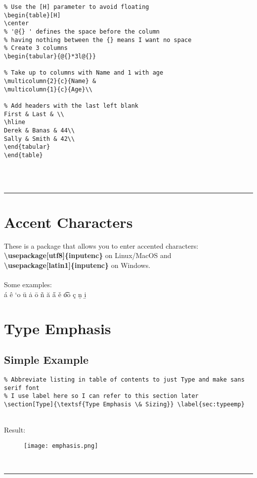 \documentclass[a4paper,12pt,titlepage]{article}
\begin{document}
\begin{minipage}{\linewidth}
\begin{lstlisting}  
% Use the [H] parameter to avoid floating
\begin{table}[H]
\center
% '@{} ' defines the space before the column
% having nothing between the {} means I want no space
% Create 3 columns
\begin{tabular}{@{}*3l@{}}

% Take up to columns with Name and 1 with age
\multicolumn{2}{c}{Name} &
\multicolumn{1}{c}{Age}\\

% Add headers with the last left blank
First & Last & \\
\hline
Derek & Banas & 44\\
Sally & Smith & 42\\
\end{tabular}
\end{table}

\end{lstlisting}
\end{minipage}
~\\
\\
\rule{\linewidth}{0.1mm}




\section{Accent Characters}
These is a package that allows you to enter accented characters:
\\
\textbf{\textbackslash usepackage[utf8]\{inputenc\}} on Linux/MacOS and
\\
\textbf{\textbackslash usepackage[latin1]\{inputenc\}} on Windows.
\\
\\
Some examples:
\\
\'{a} \^{e} `{o} \"{u} \.{a} \={o} \~{n} \u{a} \H{a} \v{e} \t{oo} \c{c} \d{n} \b{i}




\section{Type Emphasis}
\subsection{Simple Example}
\begin{lstlisting} 
% Abbreviate listing in table of contents to just Type and make sans serif font
% I use label here so I can refer to this section later
\section[Type]{\textsf{Type Emphasis \& Sizing}} \label{sec:typeemp}
\end{lstlisting}  
~\\
Result:
\begin{figure}[ht]
\texttt{[image: emphasis.png]}
\end{figure}
~\\
\rule{\linewidth}{0.1mm}
\end{document}
